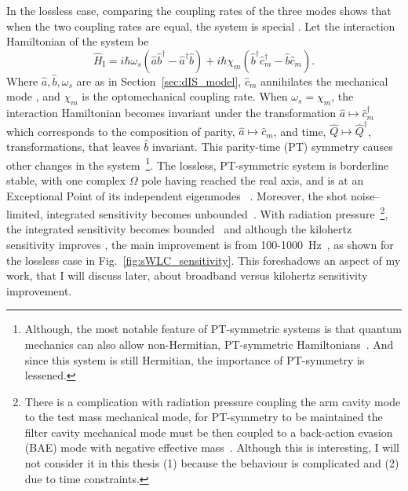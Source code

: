In the lossless case, comparing the coupling rates of the three modes shows that when the two coupling rates are equal, the system is special . Let the interaction Hamiltonian of the system be~\cite{} $$\hat{H}_\text{I}=i\hbar\omega_s(\hat{a}\hat{b}^\dag-\hat{a}^\dag\hat{b})+i\hbar\chi_m(\hat{b}^\dag\hat{c}_m^\dag-\hat{b}\hat{c}_m).$$ Where $\hat a, \hat b, \omega_s$ are as in Section~\ref{sec:dIS_model}, $\hat{c}_m$ annihilates the mechanical mode , and $\chi_m$ is the optomechanical coupling rate. When $\omega_s=\chi_m$, the interaction Hamiltonian becomes invariant under the transformation $\hat a\mapsto\hat{c}_m^\dag$ which corresponds to the composition of parity, $\hat a\mapsto \hat{c}_m$, and time, $\hat Q\mapsto \hat Q^\dag$, transformations, that leaves $\hat b$ invariant. This parity-time (PT) symmetry causes other changes in the system~\footnote{Although, the most notable feature of PT-symmetric systems is that quantum mechanics can  also allow non-Hermitian, PT-symmetric Hamiltonians~\cite{}. And since this system is still Hermitian, the importance of PT-symmetry is lessened. }. 
The lossless, PT-symmetric system is borderline stable, with one complex $\Omega$ pole having reached the real axis, and is at an Exceptional Point of its independent eigenmodes~\cite{Li2020} . Moreover, the shot noise--limited, integrated sensitivity becomes unbounded~\cite{}. With radiation pressure~\footnote{There is a complication with radiation pressure coupling the arm cavity mode to the test mass mechanical mode, for PT-symmetry to be maintained the filter cavity mechanical mode must be then coupled to a back-action evasion (BAE) mode with negative effective mass~\cite{}. Although this is interesting, I will not consider it in this thesis (1) because the behaviour is complicated and (2) due to time constraints.}, the integrated sensitivity becomes bounded~\cite{} and although the kilohertz sensitivity improves , the main improvement is from 100-1000~Hz~\cite{}, as shown for the lossless case in Fig.~\ref{fig:sWLC_sensitivity}. This foreshadows an aspect of my work, that I will discuss later, about broadband versus kilohertz sensitivity improvement. 


